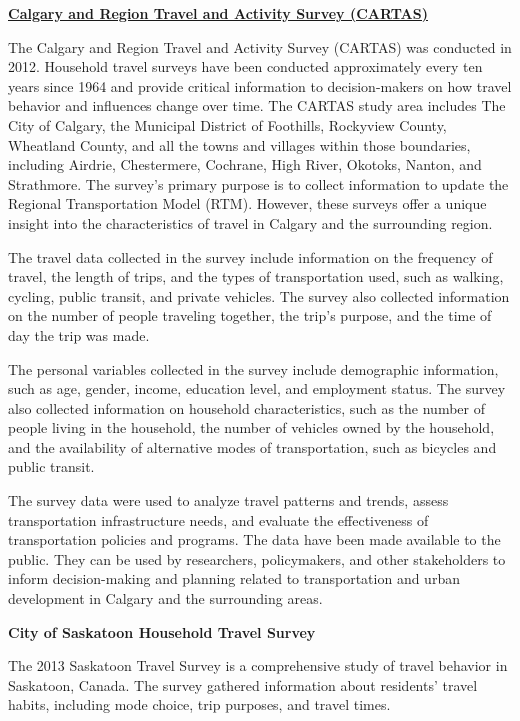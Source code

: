 \documentclass[
11pt, %
oneside, %
english, %
singlespacing, %
]{macthesis} %
\begin{document}
\textbf{\href{https://www.calgary.ca/planning/transportation/surveys.html?redirect=/travelsurveys}{Calgary and Region Travel and Activity Survey (CARTAS)}}

The Calgary and Region Travel and Activity Survey (CARTAS) was conducted in 2012. Household travel surveys have been conducted approximately every ten years since 1964 and provide critical information to decision-makers on how travel behavior and influences change over time. The CARTAS study area includes The City of Calgary, the Municipal District of Foothills, Rockyview County, Wheatland County, and all the towns and villages within those boundaries, including Airdrie, Chestermere, Cochrane, High River, Okotoks, Nanton, and Strathmore. The survey's primary purpose is to collect information to update the Regional Transportation Model (RTM). However, these surveys offer a unique insight into the characteristics of travel in Calgary and the surrounding region.

The travel data collected in the survey include information on the frequency of travel, the length of trips, and the types of transportation used, such as walking, cycling, public transit, and private vehicles. The survey also collected information on the number of people traveling together, the trip's purpose, and the time of day the trip was made.

The personal variables collected in the survey include demographic information, such as age, gender, income, education level, and employment status. The survey also collected information on household characteristics, such as the number of people living in the household, the number of vehicles owned by the household, and the availability of alternative modes of transportation, such as bicycles and public transit.

The survey data were used to analyze travel patterns and trends, assess transportation infrastructure needs, and evaluate the effectiveness of transportation policies and programs. The data have been made available to the public. They can be used by researchers, policymakers, and other stakeholders to inform decision-making and planning related to transportation and urban development in Calgary and the surrounding areas.

\textbf{City of Saskatoon Household Travel Survey}

The 2013 Saskatoon Travel Survey is a comprehensive study of travel behavior in Saskatoon, Canada. The survey gathered information about residents' travel habits, including mode choice, trip purposes, and travel times.
\end{document}
